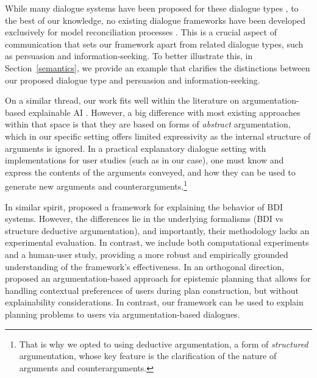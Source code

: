 \documentclass{article}
\begin{document}
While many dialogue systems have been proposed for these dialogue types \cite{black2021argumentation}, to the best of our knowledge, no existing dialogue frameworks have been developed exclusively for model reconciliation processes \cite{chakraborti2017plan}.
This is a crucial aspect of communication that sets our framework apart from related dialogue types, such as persuasion and information-seeking. To better illustrate this, in Section~\ref{semantics}, we provide an example that clarifies the distinctions between our proposed dialogue type and persuasion and information-seeking. 



On a similar thread, our work fits well within the literature on argumentation-based explainable AI \cite{ijcai2021p0600}. However, a big difference with most existing approaches within that space \cite{FanT15,collins2019towards,oren2020argument,budan2020proximity,rago2023interactive} is that they are based on forms of \emph{abstract} argumentation, which in our specific setting offers limited expressivity as the internal structure of arguments is ignored. In a practical explanatory dialogue setting with implementations for user studies (such as in our case), one must know and express the contents of the arguments conveyed, and how they can be used to generate new arguments and counterarguments.\footnote{That is why we opted to using deductive argumentation, a form of \emph{structured} argumentation, whose key feature is the clarification of the nature of arguments and counterarguments.} 



In similar spirit, \citet{dennis2022explaining} proposed a framework for explaining the behavior of BDI systems. However, the differences lie in the underlying formalisms (BDI vs structure deductive argumentation), and importantly, their methodology lacks an experimental evaluation. In contrast, we include both computational experiments and a human-user study, providing a more robust and empirically grounded understanding of the framework's effectiveness. In an orthogonal direction, \citet{teze2022approach} proposed an argumentation-based approach for epistemic planning that allows for handling contextual preferences of users during plan construction, but without explainability considerations. In contrast, our framework can be used to explain planning problems to users via argumentation-based dialogues.
\end{document}
